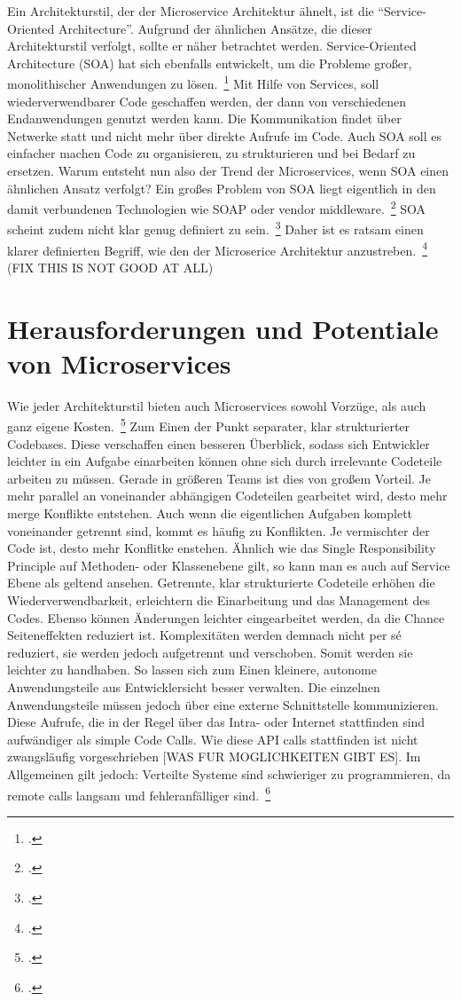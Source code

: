 Ein Architekturstil, der der Microservice Architektur ähnelt, ist die ``Service-Oriented Architecture''. Aufgrund der ähnlichen Ansätze, die dieser Architekturstil verfolgt, sollte er näher betrachtet werden.
Service-Oriented Architecture (SOA) hat sich ebenfalls entwickelt, um die Probleme großer, monolithischer Anwendungen zu lösen.~\footcite[][Seite 8]{newman2015building} Mit Hilfe von Services, soll wiederverwendbarer Code geschaffen werden, der dann von verschiedenen Endanwendungen genutzt werden kann. Die Kommunikation findet über Netwerke statt und nicht mehr über direkte Aufrufe im Code. Auch SOA soll es einfacher machen Code zu organisieren, zu strukturieren und bei Bedarf zu ersetzen. Warum entsteht nun also der Trend der Microservices, wenn SOA einen ähnlichen Ansatz verfolgt? Ein großes Problem von SOA liegt eigentlich in den damit verbundenen Technologien wie SOAP oder vendor middleware.~\footcite[][Seite 8]{newman2015building} SOA scheint zudem nicht klar genug definiert zu sein.~\footcite[vgl.][]{Fowler:Intro} Daher ist es ratsam einen klarer definierten Begriff, wie den der Microserice Architektur anzustreben.~\footcite[][]{Fowler:Intro}
(FIX THIS IS NOT GOOD AT ALL)

\section{Herausforderungen und Potentiale von Microservices}
Wie jeder Architekturstil bieten auch Microservices sowohl Vorzüge, als auch ganz eigene Kosten.~\footcite[vgl.][]{Fowler:Guide} 
Zum Einen der Punkt separater, klar strukturierter Codebases. Diese verschaffen einen besseren Überblick, sodass sich Entwickler leichter in ein Aufgabe einarbeiten können ohne sich durch irrelevante Codeteile arbeiten zu müssen. Gerade in größeren Teams ist dies von großem Vorteil. Je mehr parallel an voneinander abhängigen Codeteilen gearbeitet wird, desto mehr merge Konflikte entstehen. Auch wenn die eigentlichen Aufgaben komplett voneinander getrennt sind, kommt es häufig zu Konflikten. Je vermischter der Code ist, desto mehr Konflitke enstehen. Ähnlich wie das Single Responsibility Principle auf Methoden- oder Klassenebene gilt, so kann man es auch auf Service Ebene als geltend ansehen. Getrennte, klar strukturierte Codeteile erhöhen die Wiederverwendbarkeit, erleichtern die Einarbeitung und das Management des Codes. Ebenso können Änderungen leichter eingearbeitet werden, da die Chance Seiteneffekten reduziert ist. Komplexitäten werden demnach nicht per sé reduziert, sie werden jedoch aufgetrennt und verschoben. Somit werden sie leichter zu handhaben.
So lassen sich zum Einen kleinere, autonome Anwendungsteile aus Entwicklersicht besser verwalten. Die einzelnen Anwendungsteile müssen jedoch über eine externe Schnittstelle kommunizieren. Diese Aufrufe, die in der Regel über das Intra- oder Internet stattfinden sind aufwändiger als simple Code Calls. Wie diese API calls stattfinden ist nicht zwangsläufig vorgeschrieben [WAS FUR MOGLICHKEITEN GIBT ES]. Im Allgemeinen gilt jedoch: Verteilte Systeme sind schwieriger zu programmieren, da remote calls langsam und fehleranfälliger sind.~\footcite[vgl.][]{Fowler:Guide}

